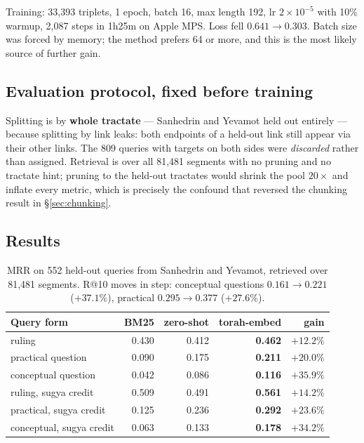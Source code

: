 \documentclass[11pt,a4paper]{article}
\begin{document}
Training: 33{,}393 triplets, 1 epoch, batch 16, max length 192, lr $2\times
10^{-5}$ with 10\% warmup, 2{,}087 steps in 1h25m on Apple MPS. Loss fell
$0.641 \to 0.303$. Batch size was forced by memory; the method prefers 64 or
more, and this is the most likely source of further gain.

\subsection{Evaluation protocol, fixed before training}

Splitting is by \textbf{whole tractate} --- Sanhedrin and Yevamot held out
entirely --- because splitting by link leaks: both endpoints of a held-out link
still appear via their other links. The 809 queries with targets on both sides
were \emph{discarded} rather than assigned. Retrieval is over all 81{,}481
segments with no pruning and no tractate hint; pruning to the held-out tractates
would shrink the pool $20\times$ and inflate every metric, which is precisely
the confound that reversed the chunking result in \S\ref{sec:chunking}.

\subsection{Results}

\begin{table}[h]
\centering
\begin{tabular}{lrrrr}
\toprule
Query form & BM25 & zero-shot & \textbf{torah-embed} & gain \\
\midrule
ruling & 0.430 & 0.412 & \textbf{0.462} & $+12.2\%$ \\
practical question & 0.090 & 0.175 & \textbf{0.211} & $+20.0\%$ \\
conceptual question & 0.042 & 0.086 & \textbf{0.116} & $\mathbf{+35.9\%}$ \\
\midrule
ruling, sugya credit & 0.509 & 0.491 & \textbf{0.561} & $+14.2\%$ \\
practical, sugya credit & 0.125 & 0.236 & \textbf{0.292} & $+23.6\%$ \\
conceptual, sugya credit & 0.063 & 0.133 & \textbf{0.178} & $+34.2\%$ \\
\bottomrule
\end{tabular}
\caption{MRR on 552 held-out queries from Sanhedrin and Yevamot, retrieved over
81{,}481 segments. R@10 moves in step: conceptual questions $0.161 \to 0.221$
($+37.1\%$), practical $0.295 \to 0.377$ ($+27.6\%$).}
\label{tab:results}
\end{table}
\end{document}
